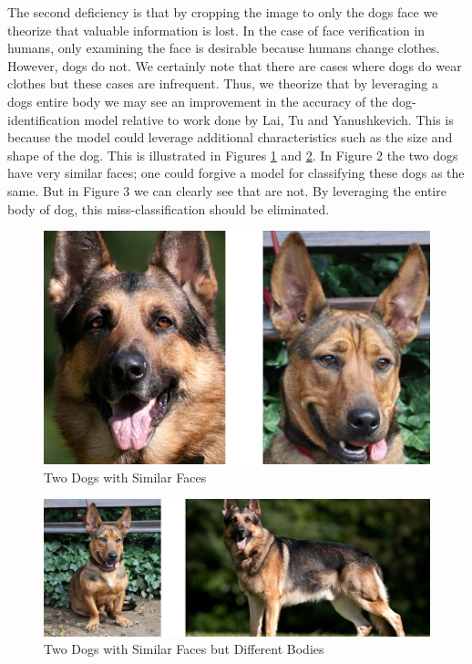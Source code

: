 \documentclass{article}
\begin{document}
The second deficiency is that by cropping the image to only the dogs face we theorize that valuable information is lost.  In the case of face verification in humans, only examining the face is desirable because humans change clothes.  However, dogs do not.  We certainly note that there are cases where dogs do wear clothes but these cases are infrequent.  Thus, we theorize that by leveraging a dogs entire body we may see an improvement in the accuracy of the dog-identification model relative to work done by  Lai, Tu and Yanushkevich.  This is because the model could leverage additional characteristics such as the size and shape of the dog.  This is illustrated in Figures \ref{fig:x similar faces} and \ref{fig:x different bodies}.  In Figure 2 the two dogs have very similar faces; one could forgive a model for classifying these dogs as the same.  But in Figure 3 we can clearly see that are not.  By leveraging the entire body of dog, this miss-classification should be eliminated.

\begin{figure}[h]
\centering
	\includegraphics{final-report-images/similar_faces.png}
\caption{Two Dogs with Similar Faces}
\label{fig:x similar faces}
\end{figure}


\begin{figure}[h]
\centering
	\includegraphics{final-report-images/different_bodies.png}
\caption{Two Dogs with Similar Faces but Different Bodies}
\label{fig:x different bodies}
\end{figure}
\end{document}
